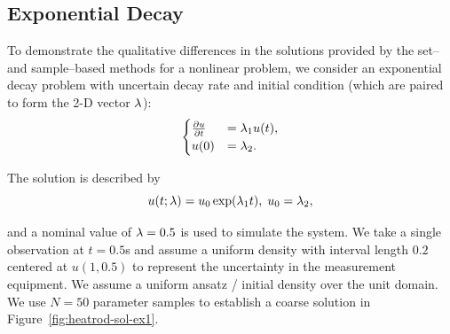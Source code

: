 
\subsection{Exponential Decay}\label{ex:decay-set-sample}

To demonstrate the qualitative differences in the solutions provided by the set-- and sample--based methods for a nonlinear problem, we consider an exponential decay problem with uncertain decay rate and initial condition (which are paired to form the 2-D vector $\lambda$):
$$
\begin{cases}
  \frac{\partial u}{\partial t} & = \lambda_1 u(t), \\
  u(0) &= \lambda_2.
\end{cases}
$$

The solution is described by
\begin{equation}
  u(t;\lambda) = u_0\exp(\lambda_1 t), \; u_0 = \lambda_2 ,
\end{equation}

and a nominal value of $\lambda = 0.5$ is used to simulate the system.
We take a single observation at $t=0.5$s and assume a uniform density with interval length $0.2$ centered at $u(1,0.5)$ to represent the uncertainty in the measurement equipment.
We assume a uniform ansatz / initial density over the unit domain.
We use $N=50$ parameter samples to establish a coarse solution in Figure~\ref{fig:heatrod-sol-ex1}.


